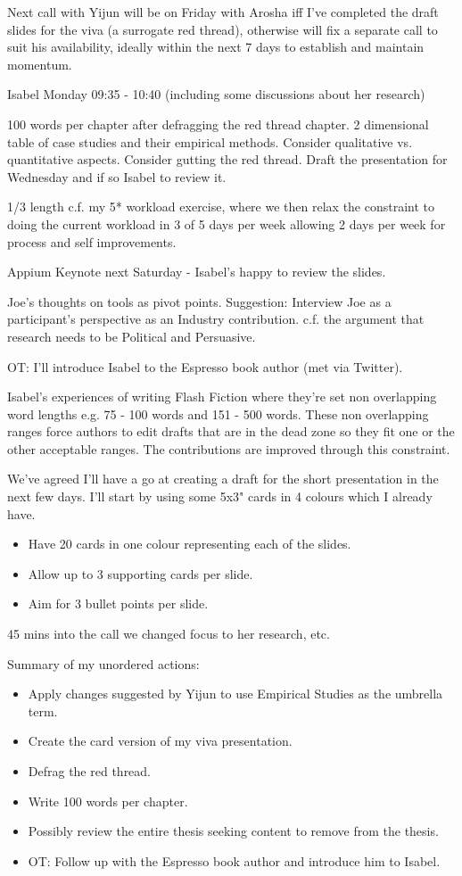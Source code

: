 Next call with Yijun will be on Friday with Arosha iff I've completed the draft slides for the viva (a surrogate red thread), otherwise will fix a separate call to suit his availability, ideally within the next 7 days to establish and maintain momentum.

\dotfill

Isabel Monday 09:35 - 10:40 (including some discussions about her research)

100 words per chapter after defragging the red thread chapter.
2 dimensional table of case studies and their empirical methods. Consider qualitative vs. quantitative aspects. 
Consider gutting the red thread.
Draft the presentation for Wednesday and if so Isabel to review it.

1/3 length c.f. my 5* workload exercise, where we then relax the constraint to doing the current workload in 3 of 5 days per week allowing 2 days per week for process and self improvements.

Appium Keynote next Saturday - Isabel's happy to review the slides.

Joe's thoughts on tools as pivot points. Suggestion: Interview Joe as a participant's perspective as an Industry contribution.
c.f. the argument that research needs to be Political and Persuasive. 

OT: I'll introduce Isabel to the Espresso book author (met via Twitter).

Isabel's experiences of writing Flash Fiction where they're set non overlapping word lengths e.g. 75 - 100 words and 151 - 500 words. These non overlapping ranges force authors to edit drafts that are in the dead zone so they fit one or the other acceptable ranges. The contributions are improved through this constraint.

We've agreed I'll have a go at creating a draft for the short presentation in the next few days. I'll start by using some 5x3" cards in 4 colours which I already have. 
\begin{itemize}
    \item Have 20 cards in one colour representing each of the slides. 
    \item Allow up to 3 supporting cards per slide.
    \item Aim for 3 bullet points per slide. 
\end{itemize}
45 mins into the call we changed focus to her research, etc.

Summary of my unordered actions:
\begin{itemize}
    \item Apply changes suggested by Yijun to use Empirical Studies as the umbrella term.
    \item Create the card version of my viva presentation.
    \item Defrag the red thread.
    \item Write 100 words per chapter.
    \item Possibly review the entire thesis seeking content to remove from the thesis.
    \item OT: Follow up with the Espresso book author and introduce him to Isabel.
\end{itemize}


